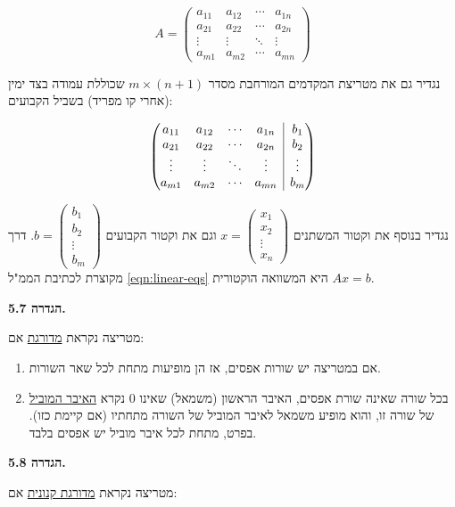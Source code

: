 \documentclass[12pt]{report}
\theoremstyle{plain}
\theoremstyle{definition}
\newcommand{\0}{\mathbf{0}}
\begin{document}
$$
A=\begin{pmatrix}a_{11} & a_{12} & \cdots & a_{1n}\\
a_{21} & a_{22} & \cdots & a_{2n}\\
\vdots & \vdots & \ddots & \vdots\\
a_{m1} & a_{m2} & \cdots & a_{mn}
\end{pmatrix}
$$

נגדיר גם את מטריצת המקדמים המורחבת
מסדר
$m\times(n+1)$
שכוללת עמודה בצד ימין (אחרי קו מפריד) בשביל
הקבועים:

$$
\left( \begin{array}{@{}cccc|c@{}}
	a_{11} & a_{12} & \cdots & a_{1n} & b_1 \\
	a_{21} & a_{22} & \cdots & a_{2n} & b_2 \\
	\vdots & \vdots & \ddots & \vdots & \vdots \\
	a_{m1} & a_{m2} & \cdots & a_{mn} & b_m
\end{array} \right)
$$

נגדיר בנוסף את וקטור המשתנים
$x=\begin{pmatrix}x_1\\
x_2\\
\vdots\\
x_n
\end{pmatrix}$
וגם את וקטור הקבועים
$b=\begin{pmatrix}b_1\\
b_2\\
\vdots\\
b_m
\end{pmatrix}$.
דרך מקוצרת לכתיבת הממ"ל 
\ref{eqn:linear-eqs}
היא המשוואה הוקטורית
$Ax=b$.
\bigskip
\bigskip

\noindent\textbf{הגדרה 5.7.}

מטריצה נקראת
\underline{מדורגת}
אם:

\begin{enumerate}[label=\alph*.]
\item
אם במטריצה יש שורות אפסים, אז הן מופיעות מתחת לכל
שאר השורות.

\item
בכל שורה שאינה שורת אפסים, האיבר הראשון (משמאל) שאינו $0$ נקרא
\underline{האיבר המוביל}
של שורה זו, והוא מופיע משמאל לאיבר המוביל של השורה מתחתיו (אם קיימת כזו). בפרט, מתחת לכל איבר מוביל יש אפסים בלבד.
\end{enumerate}
\bigskip
\bigskip

\noindent\textbf{הגדרה 5.8.}

מטריצה נקראת
\underline{מדורגת קנונית}
אם:
\end{document}
